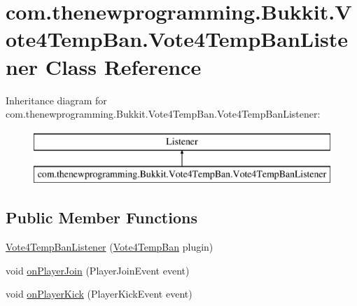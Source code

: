 \hypertarget{classcom_1_1thenewprogramming_1_1_bukkit_1_1_vote4_temp_ban_1_1_vote4_temp_ban_listener}{\section{com.\-thenewprogramming.\-Bukkit.\-Vote4\-Temp\-Ban.\-Vote4\-Temp\-Ban\-Listener Class Reference}
\label{classcom_1_1thenewprogramming_1_1_bukkit_1_1_vote4_temp_ban_1_1_vote4_temp_ban_listener}
}
Inheritance diagram for com.\-thenewprogramming.\-Bukkit.\-Vote4\-Temp\-Ban.\-Vote4\-Temp\-Ban\-Listener\-:\begin{figure}[H]
\begin{center}
\leavevmode
\includegraphics[height=2.000000cm]{classcom_1_1thenewprogramming_1_1_bukkit_1_1_vote4_temp_ban_1_1_vote4_temp_ban_listener}
\end{center}
\end{figure}
\subsection*{Public Member Functions}
\begin{DoxyCompactItemize}
\item 
\hyperlink{classcom_1_1thenewprogramming_1_1_bukkit_1_1_vote4_temp_ban_1_1_vote4_temp_ban_listener_a66026b32788e9c3f44b82f8f42adc395}{Vote4\-Temp\-Ban\-Listener} (\hyperlink{classcom_1_1thenewprogramming_1_1_bukkit_1_1_vote4_temp_ban_1_1_vote4_temp_ban}{Vote4\-Temp\-Ban} plugin)
\item 
void \hyperlink{classcom_1_1thenewprogramming_1_1_bukkit_1_1_vote4_temp_ban_1_1_vote4_temp_ban_listener_a8073e5e661a7c9829e6f28ef3d5b7df4}{on\-Player\-Join} (Player\-Join\-Event event)
\item 
void \hyperlink{classcom_1_1thenewprogramming_1_1_bukkit_1_1_vote4_temp_ban_1_1_vote4_temp_ban_listener_a89c57b6ee6d4d3553acd571f8a7839f7}{on\-Player\-Kick} (Player\-Kick\-Event event)
\end{DoxyCompactItemize}



